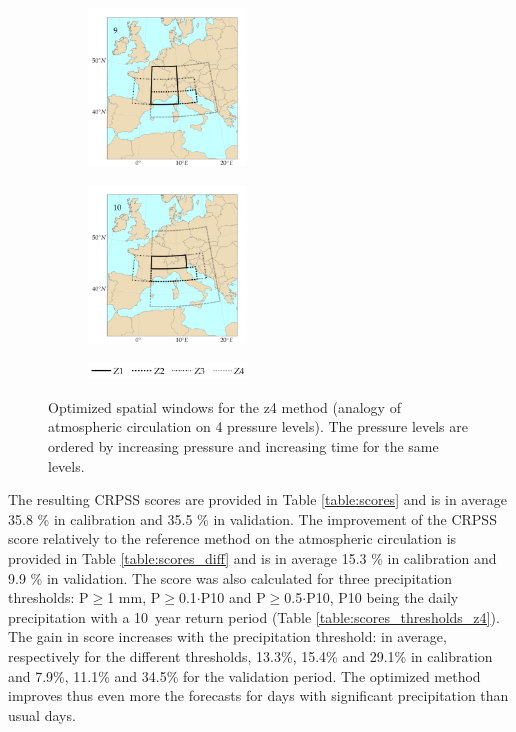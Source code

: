 \documentclass[5p]{elsarticle}
\begin{document}
\begin{figure}[htb]
\begin{subfigure}{.5\columnwidth}
	\end{subfigure}
	\begin{subfigure}{.5\columnwidth}
		\centering
		\includegraphics[width=4.2cm]{figures/spatial_win_z4/Spatial_windows_9.png}
	\end{subfigure}%
	\begin{subfigure}{.5\columnwidth}
		\centering
		\includegraphics[width=4.2cm]{figures/spatial_win_z4/Spatial_windows_10.png}
	\end{subfigure}
	\begin{subfigure}{.5\columnwidth}
		\centering
		\includegraphics[width=4.2cm]{figures/spatial_win_z4/legend.png}
	\end{subfigure}
	\caption{Optimized spatial windows for the z4 method (analogy of atmospheric circulation on 4 pressure levels). The pressure levels are ordered by increasing pressure and increasing time for the same levels.}
	\label{fig:spatial_windows_z4}
\end{figure}

The resulting CRPSS scores are provided in Table \ref{table:scores} and is in average 35.8 \% in calibration and 35.5 \% in validation. The improvement of the CRPSS score relatively to the reference method on the atmospheric circulation is provided in Table \ref{table:scores_diff} and is in average 15.3 \% in calibration and 9.9 \% in validation. The score was also calculated for three precipitation thresholds: P\(\geq\)1 mm, P\(\geq\)0.1\(\cdot\)P10 and P\(\geq\)0.5\(\cdot\)P10, P10 being the daily precipitation with a 10~year return period (Table \ref{table:scores_thresholds_z4}). The gain in score increases with the precipitation threshold: in average, respectively for the different thresholds, 13.3\%, 15.4\% and 29.1\% in calibration and 7.9\%, 11.1\% and 34.5\% for the validation period. The optimized method improves thus even more the forecasts for days with significant precipitation than usual days.
\end{document}
